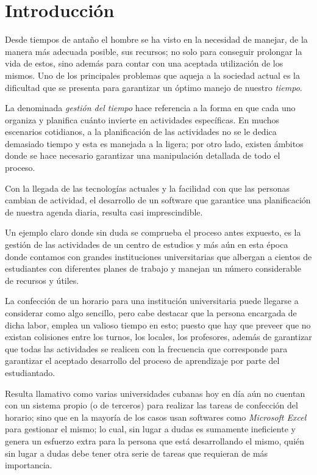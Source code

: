 \chapter{Introducción}

Desde tiempos de antaño el hombre se ha visto en la necesidad de manejar, de la manera más adecuada posible, sus recursos; no solo para conseguir prolongar la vida de estos, sino además para contar con una aceptada utilización de los mismos. Uno de los principales problemas que aqueja a la sociedad actual es la dificultad que se presenta para garantizar un óptimo manejo de nuestro \textit{tiempo}.\cite{bbc_time_management}
	
La denominada \textit{gestión del tiempo} hace referencia a la forma en que cada uno organiza y planifica cuánto invierte en actividades específicas. En muchos escenarios cotidianos, a la planificación de las actividades no se le dedica demasiado tiempo y esta es manejada a la ligera; por otro lado, existen ámbitos donde se hace necesario garantizar una manipulación detallada de todo el proceso.
	
Con la llegada de las tecnologías actuales y la facilidad con que las personas cambian de actividad, el desarrollo de un software que garantice una planificación de nuestra agenda diaria, resulta casi imprescindible.
	
Un ejemplo claro donde sin duda se comprueba el proceso antes expuesto, es la gestión de las actividades de un centro de estudios y más aún en esta época donde contamos con grandes instituciones universitarias que albergan a cientos de estudiantes con diferentes planes de trabajo y manejan un número considerable de recursos y útiles.
	
La confección de un horario para una institución universitaria puede llegarse a considerar como algo sencillo, pero cabe destacar que la persona encargada de dicha labor, emplea un valioso tiempo en esto; puesto que hay que preveer que no existan colisiones entre los turnos, los locales, los profesores, además de garantizar que todas las actividades se realicen con la frecuencia que corresponde para garantizar el aceptado desarrollo del proceso de aprendizaje por parte del estudiantado.
	
Resulta llamativo como varias universidades cubanas hoy en día aún no cuentan con un sistema propio (o de terceros) para realizar las tareas de confección del horario; sino que en la mayoría de los casos usan softwares como \textit{Microsoft Excel} para gestionar el mismo; lo cual, sin lugar a dudas es sumamente ineficiente y genera un esfuerzo extra para la persona que está desarrollando el mismo, quién sin lugar a dudas debe tener otra serie de tareas que requieran de más importancia.
	
